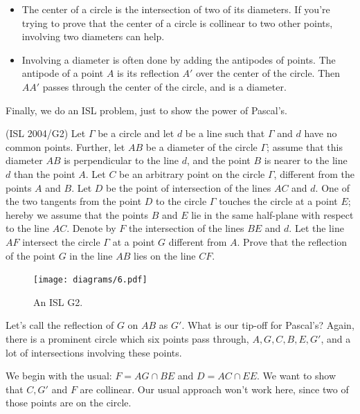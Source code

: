 \documentclass[11pt,paper=letter]{scrartcl}
\begin{document}
\begin{itemize}

\item The center of a circle is the intersection of two of its diameters. If you're trying to prove that the center of a circle is collinear to two other points, involving two diameters can help.

\item Involving a diameter is often done by adding the antipodes of points. The antipode of a point $A$ is its reflection $A'$ over the center of the circle. Then $AA'$ passes through the center of the circle, and is a diameter.

\end{itemize}

Finally, we do an ISL problem, just to show the power of Pascal's.

\begin{problem}
  (ISL 2004/G2) Let $\Gamma$ be a circle and let $d$ be a line such that $\Gamma$ and $d$ have no common points. Further, let $AB$ be a diameter of the circle $\Gamma$; assume that this diameter $AB$ is perpendicular to the line $d$, and the point $B$ is nearer to the line $d$ than the point $A$. Let $C$ be an arbitrary point on the circle $\Gamma$, different from the points $A$ and $B$. Let $D$ be the point of intersection of the lines $AC$ and $d$. One of the two tangents from the point $D$ to the circle $\Gamma$ touches the circle at a point $E$; hereby we assume that the points $B$ and $E$ lie in the same half-plane with respect to the line $AC$. Denote by $F$ the intersection of the lines $BE$ and $d$. Let the line $AF$ intersect the circle $\Gamma$ at a point $G$ different from $A$. Prove that the reflection of the point $G$ in the line $AB$ lies on the line $CF$.
\end{problem}

\begin{figure}
\centering
    \texttt{[image: diagrams/6.pdf]}
\caption{An ISL G2.}
\end{figure}

Let's call the reflection of $G$ on $AB$ as $G'$. What is our tip-off for Pascal's? Again, there is a prominent circle which six points pass through, $A, G, C, B, E, G'$, and a lot of intersections involving these points.

We begin with the usual: $F = AG \cap BE$ and $D = AC \cap EE$. We want to show that $C, G'$ and $F$ are collinear. Our usual approach won't work here, since two of those points are on the circle.
\end{document}
